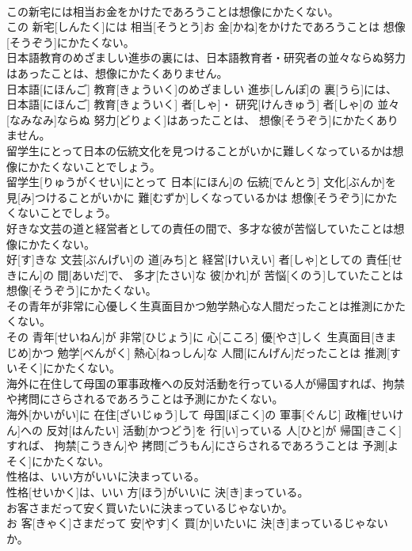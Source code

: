 \documentclass[8pt]{extreport}
\begin{document}
\begin{CJK}{UTF8}{min}
\\	この新宅には相当お金をかけたであろうことは想像にかたくない。	
\\	この 新宅[しんたく]には 相当[そうとう]お 金[かね]をかけたであろうことは 想像[そうぞう]にかたくない。
\\	日本語教育のめざましい進歩の裏には、日本語教育者・研究者の並々ならぬ努力はあったことは、想像にかたくありません。	
\\	日本語[にほんご] 教育[きょういく]のめざましい 進歩[しんぽ]の 裏[うら]には、 日本語[にほんご] 教育[きょういく] 者[しゃ]・ 研究[けんきゅう] 者[しゃ]の 並々[なみなみ]ならぬ 努力[どりょく]はあったことは、 想像[そうぞう]にかたくありません。
\\	留学生にとって日本の伝統文化を見つけることがいかに難しくなっているかは想像にかたくないことでしょう。	
\\	留学生[りゅうがくせい]にとって 日本[にほん]の 伝統[でんとう] 文化[ぶんか]を 見[み]つけることがいかに 難[むずか]しくなっているかは 想像[そうぞう]にかたくないことでしょう。
\\	好きな文芸の道と経営者としての責任の間で、多才な彼が苦悩していたことは想像にかたくない。	
\\	好[す]きな 文芸[ぶんげい]の 道[みち]と 経営[けいえい] 者[しゃ]としての 責任[せきにん]の 間[あいだ]で、 多才[たさい]な 彼[かれ]が 苦悩[くのう]していたことは 想像[そうぞう]にかたくない。
\\	その青年が非常に心優しく生真面目かつ勉学熱心な人間だったことは推測にかたくない。	
\\	その 青年[せいねん]が 非常[ひじょう]に 心[こころ] 優[やさ]しく 生真面目[きまじめ]かつ 勉学[べんがく] 熱心[ねっしん]な 人間[にんげん]だったことは 推測[すいそく]にかたくない。
\\	海外に在住して母国の軍事政権への反対活動を行っている人が帰国すれば、拘禁や拷問にさらされるであろうことは予測にかたくない。	
\\	海外[かいがい]に 在住[ざいじゅう]して 母国[ぼこく]の 軍事[ぐんじ] 政権[せいけん]への 反対[はんたい] 活動[かつどう]を 行[い]っている 人[ひと]が 帰国[きこく]すれば、 拘禁[こうきん]や 拷問[ごうもん]にさらされるであろうことは 予測[よそく]にかたくない。
\\	性格は、いい方がいいに決まっている。	
\\	性格[せいかく]は、いい 方[ほう]がいいに 決[き]まっている。
\\	お客さまだって安く買いたいに決まっているじゃないか。	
\\	お 客[きゃく]さまだって 安[やす]く 買[か]いたいに 決[き]まっているじゃないか。

\end{CJK}
\end{document}
